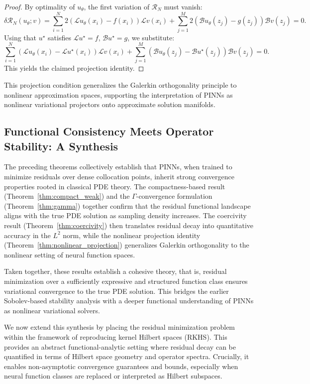 \documentclass[11pt, a4paper]{article}
\begin{document}
\begin{proof}
By optimality of $u_\theta$, the first variation of $\mathcal{R}_N$ must vanish:
\[
\delta \mathcal{R}_N(u_\theta; v) = \sum_{i=1}^N 2(\mathcal{L}u_\theta(x_i) - f(x_i))\mathcal{L}v(x_i) + \sum_{j=1}^M 2(\mathcal{B}u_\theta(z_j) - g(z_j))\mathcal{B}v(z_j) = 0.
\]
Using that $u^\star$ satisfies $\mathcal{L}u^\star = f$, $\mathcal{B}u^\star = g$, we substitute:
\[
\sum_{i=1}^N (\mathcal{L}u_\theta(x_i) - \mathcal{L}u^\star(x_i)) \mathcal{L}v(x_i) + \sum_{j=1}^M (\mathcal{B}u_\theta(z_j) - \mathcal{B}u^\star(z_j)) \mathcal{B}v(z_j) = 0.
\]
This yields the claimed projection identity.
\end{proof}

\vspace{1em}
This projection condition generalizes the Galerkin orthogonality principle to nonlinear approximation spaces, supporting the interpretation of PINNs as nonlinear variational projectors onto approximate solution manifolds.

\subsection{Functional Consistency Meets Operator Stability: A Synthesis}

The preceding theorems collectively establish that PINNs, when trained to minimize residuals over dense collocation points, inherit strong convergence properties rooted in classical PDE theory. The compactness-based result (Theorem~\ref{thm:compact_weak}) and the $\Gamma$-convergence formulation (Theorem~\ref{thm:gamma}) together confirm that the residual functional landscape aligns with the true PDE solution as sampling density increases. The coercivity result (Theorem~\ref{thm:coercivity}) then translates residual decay into quantitative accuracy in the $L^2$ norm, while the nonlinear projection identity (Theorem~\ref{thm:nonlinear_projection}) generalizes Galerkin orthogonality to the nonlinear setting of neural function spaces.

Taken together, these results establish a cohesive theory, that is, residual minimization over a sufficiently expressive and structured function class ensures variational convergence to the true PDE solution. This bridges the earlier Sobolev-based stability analysis with a deeper functional understanding of PINNs as nonlinear variational solvers.

We now extend this synthesis by placing the residual minimization problem within the framework of reproducing kernel Hilbert spaces (RKHS). This provides an abstract functional-analytic setting where residual decay can be quantified in terms of Hilbert space geometry and operator spectra. Crucially, it enables non-asymptotic convergence guarantees and bounds, especially when neural function classes are replaced or interpreted as Hilbert subspaces.
\end{document}
